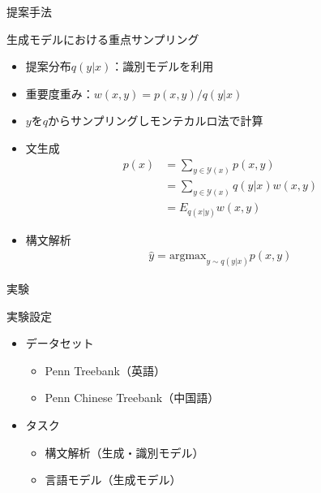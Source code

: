 \documentclass[aspectratio=43,unicode,10pt]{beamer}
\begin{document}
\begin{frame}{提案手法}
  \begin{block}{生成モデルにおける重点サンプリング}
    \begin{itemize}
      \item 提案分布$q(y|x)$：識別モデルを利用
      \item 重要度重み：$w(x, y) = p(x, y) / q(y | x)$
      \item $y$を$q$からサンプリングしモンテカルロ法で計算
      \item 文生成
        \begin{align*}
          p(x)
          & = \sum_{y \in \mathcal{Y}(x)} p(x, y) \\
          & = \sum_{y \in \mathcal{Y}(x)} q(y|x) w(x, y) \\
          & = E_{q(x|y)} w(x, y)
        \end{align*}
      \item 構文解析
        \begin{gather*}
          \hat{y} = \text{argmax}_{y \sim q(y|x)} p(x, y)
        \end{gather*}
    \end{itemize}
  \end{block}
\end{frame}

\begin{frame}{実験}
  \begin{block}{実験設定}
    \begin{itemize}
      \item データセット
        \begin{itemize}
          \item Penn Treebank（英語）
          \item Penn Chinese Treebank（中国語）
        \end{itemize}
      \item タスク
        \begin{itemize}
          \item 構文解析（生成・識別モデル）
          \item 言語モデル（生成モデル）
        \end{itemize}
    \end{itemize}
  \end{block}
\end{frame}
\end{document}

